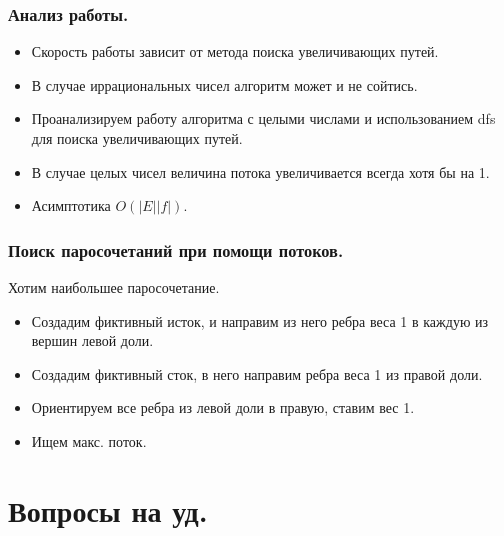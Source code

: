 \documentclass[a4paper,14pt]{article}
\begin{document}
    \subsubsection*{Анализ работы.}
    \begin{itemize}
        \item Скорость работы зависит от метода поиска увеличивающих
        путей.
        \item В случае иррациональных чисел алгоритм может и не сойтись.
        \item Проанализируем работу алгоритма с целыми числами и
        использованием dfs для поиска увеличивающих путей.
        \item В случае целых чисел величина потока увеличивается всегда
        хотя бы на 1.
        \item Асимптотика $O(|E||f|)$.
    \end{itemize}
    \subsubsection*{Поиск паросочетаний при помощи потоков.}
    Хотим наибольшее паросочетание.
    \begin{itemize}
        \item Создадим фиктивный исток, и направим из него ребра веса 1 в
        каждую из вершин левой доли.
        \item Создадим фиктивный сток, в него направим ребра веса 1 из
        правой доли.
        \item Ориентируем все ребра из левой доли в правую, ставим вес 1.
        \item Ищем макс. поток.
    \end{itemize}

    \section{Вопросы на уд.}
\end{document}

